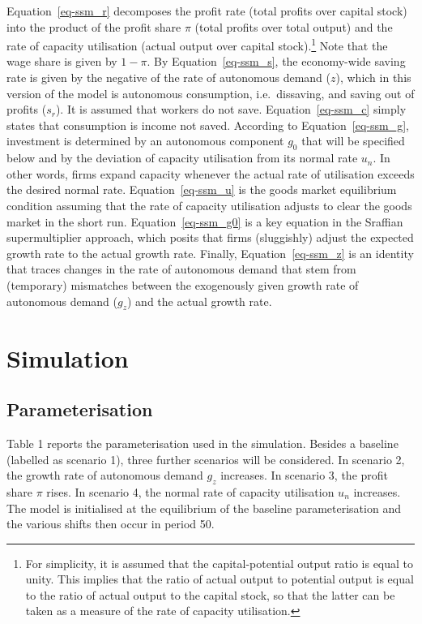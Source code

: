\documentclass[
  letterpaper,
  DIV=11,
  numbers=noendperiod]{scrreprt}
\begin{document}
Equation~\ref{eq-ssm_r} decomposes the profit rate (total profits over
capital stock) into the product of the profit share \(\pi\) (total
profits over total output) and the rate of capacity utilisation (actual
output over capital stock).\footnote{For simplicity, it is assumed that
  the capital-potential output ratio is equal to unity. This implies
  that the ratio of actual output to potential output is equal to the
  ratio of actual output to the capital stock, so that the latter can be
  taken as a measure of the rate of capacity utilisation.} Note that the
wage share is given by \(1-\pi\). By Equation~\ref{eq-ssm_s}, the
economy-wide saving rate is given by the negative of the rate of
autonomous demand (\(z\)), which in this version of the model is
autonomous consumption, i.e.~dissaving, and saving out of profits
(\(s_r\)). It is assumed that workers do not save.
Equation~\ref{eq-ssm_c} simply states that consumption is income not
saved. According to Equation~\ref{eq-ssm_g}, investment is determined by
an autonomous component \(g_0\) that will be specified below and by the
deviation of capacity utilisation from its normal rate \(u_n\). In other
words, firms expand capacity whenever the actual rate of utilisation
exceeds the desired normal rate. Equation~\ref{eq-ssm_u} is the goods
market equilibrium condition assuming that the rate of capacity
utilisation adjusts to clear the goods market in the short run.
Equation~\ref{eq-ssm_g0} is a key equation in the Sraffian
supermultiplier approach, which posits that firms (sluggishly) adjust
the expected growth rate to the actual growth rate. Finally,
Equation~\ref{eq-ssm_z} is an identity that traces changes in the rate
of autonomous demand that stem from (temporary) mismatches between the
exogenously given growth rate of autonomous demand (\(g_z\)) and the
actual growth rate.

\section{Simulation}\label{simulation-8}

\subsection{Parameterisation}\label{parameterisation-8}

Table 1 reports the parameterisation used in the simulation. Besides a
baseline (labelled as scenario 1), three further scenarios will be
considered. In scenario 2, the growth rate of autonomous demand \(g_z\)
increases. In scenario 3, the profit share \(\pi\) rises. In scenario 4,
the normal rate of capacity utilisation \(u_n\) increases. The model is
initialised at the equilibrium of the baseline parameterisation and the
various shifts then occur in period 50.
\end{document}
